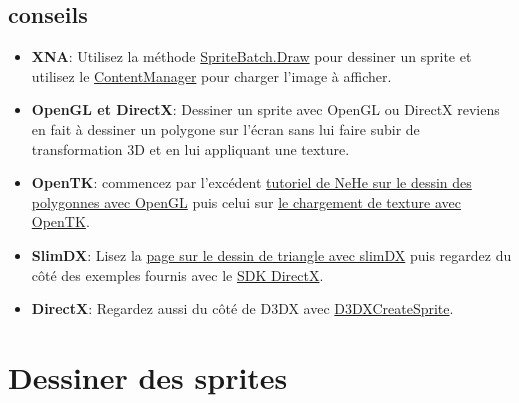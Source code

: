\documentclass[12pt,a4paper]{report}
\begin{document}
\subsection{conseils}
\begin{itemize}
\item \textbf{XNA}: Utilisez la méthode  \href{http://msdn.microsoft.com/en-us/library/ff433986.aspx}{SpriteBatch.Draw} pour dessiner un sprite et utilisez
le \href{http://msdn.microsoft.com/en-us/library/bb197848.aspx}{ContentManager} pour charger l'image à afficher.
\item\textbf{OpenGL et DirectX}: Dessiner un sprite avec OpenGL ou DirectX reviens en fait à dessiner un polygone sur l'écran sans lui faire subir de transformation 3D et en lui appliquant une texture.
\item\textbf{OpenTK}: commencez par l'excédent  \href{http://nehe.gamedev.net/tutorial/your_first_polygon/13002/}{tutoriel de NeHe sur le dessin des polygonnes avec OpenGL} puis celui sur \href{http://www.opentk.com/doc/graphics/textures/loading}{le chargement de texture avec OpenTK}.
\item \textbf{SlimDX}: Lisez la \href{http://slimdx.org/tutorials/SimpleTriangle.php}{page sur le dessin de triangle avec slimDX} puis
regardez du côté des exemples fournis avec le \href{http://www.microsoft.com/en-us/download/details.aspx?id=6812}{SDK DirectX}.
\item \textbf{DirectX}: Regardez aussi du côté de D3DX avec \href{http://msdn.microsoft.com/en-us/library/bb172797(v=vs.85).aspx}{D3DXCreateSprite}.
\end{itemize}
\newpage

\section{Dessiner des sprites}
\end{document}
